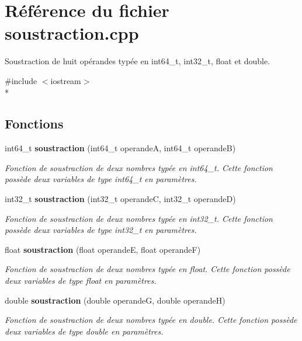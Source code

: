 \section{Référence du fichier soustraction.\-cpp}
\label{soustraction_8cpp}


Soustraction de huit opérandes typée en int64\-\_\-t, int32\-\_\-t, float et double.  


{\ttfamily \#include $<$iostream$>$}\\*
\subsection*{Fonctions}
\begin{DoxyCompactItemize}
\item 
int64\-\_\-t {\bf soustraction} (int64\-\_\-t operande\-A, int64\-\_\-t operande\-B)
\begin{DoxyCompactList}\small\item\em Fonction de soustraction de deux nombres typée en int64\-\_\-t. Cette fonction possède deux variables de type int64\-\_\-t en paramètres. \end{DoxyCompactList}\item 
int32\-\_\-t {\bf soustraction} (int32\-\_\-t operande\-C, int32\-\_\-t operande\-D)
\begin{DoxyCompactList}\small\item\em Fonction de soustraction de deux nombres typée en int32\-\_\-t. Cette fonction possède deux variables de type int32\-\_\-t en paramètres. \end{DoxyCompactList}\item 
float {\bf soustraction} (float operande\-E, float operande\-F)
\begin{DoxyCompactList}\small\item\em Fonction de soustraction de deux nombres typée en float. Cette fonction possède deux variables de type float en paramètres. \end{DoxyCompactList}\item 
double {\bf soustraction} (double operande\-G, double operande\-H)
\begin{DoxyCompactList}\small\item\em Fonction de soustraction de deux nombres typée en double. Cette fonction possède deux variables de type double en paramètres. \end{DoxyCompactList}\end{DoxyCompactItemize}


